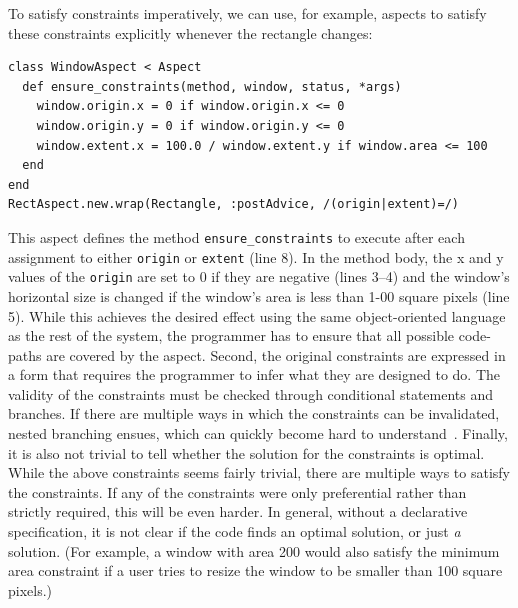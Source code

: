 To satisfy constraints imperatively, we can use, for example, aspects
to satisfy these constraints explicitly whenever the rectangle
changes:
\begin{lstlisting}
class WindowAspect < Aspect
  def ensure_constraints(method, window, status, *args)
    window.origin.x = 0 if window.origin.x <= 0
    window.origin.y = 0 if window.origin.y <= 0
    window.extent.x = 100.0 / window.extent.y if window.area <= 100
  end
end
RectAspect.new.wrap(Rectangle, :postAdvice, /(origin|extent)=/)
\end{lstlisting}
This aspect defines the method \lstinline!ensure_constraints! to
execute after each assignment to either \lstinline!origin! or
\lstinline!extent! (line 8). In the method body, the x and y values of
the \lstinline!origin! are set to 0 if they are negative (lines 3--4)
and the window's horizontal size is changed if the window's area is
less than 1-00 square pixels (line 5). While this achieves the desired
effect using the same object-oriented language as the rest of the
system, the programmer has to ensure that all possible code-paths are
covered by the aspect. Second, the original constraints are expressed
in a form that requires the programmer to infer what they are designed
to do. The validity of the constraints must be checked through
conditional statements and branches. If there are multiple ways in
which the constraints can be invalidated, nested branching ensues,
which can quickly become hard to understand~\cite{mccabe1976complexity}. Finally, it is also not trivial to tell whether the
solution for the constraints is optimal. While the above constraints
seems fairly trivial, there are multiple ways to satisfy the
constraints. If any of the constraints were only preferential rather
than strictly required, this will be even harder. In general, without
a declarative specification, it is not clear if the code finds an
optimal solution, or just \emph{a} solution. (For example, a window
with area 200 would also satisfy the minimum area constraint if a user
tries to resize the window to be smaller than 100 square pixels.)

